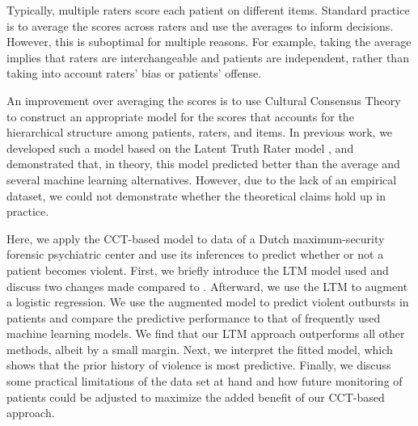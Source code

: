 \documentclass[a4paper,11pt]{article}
\begin{document}
Typically, multiple raters score each patient on different items.
Standard practice is to average the scores across raters and use the averages to inform decisions.
However, this is suboptimal for multiple reasons. %
For example, taking the average implies that raters are interchangeable and patients are independent, rather than taking into account raters' bias or patients' offense.


An improvement over averaging the scores is to use Cultural Consensus Theory \parencite[CCT;][]{romney1986culture, batchelder1988test, batchelder2012cultural} to construct an appropriate model for the scores that accounts for the hierarchical structure among patients, raters, and items.
In previous work, we developed such a model based on the Latent Truth Rater model \parencite[LTM; ][]{Anders2015cultural}, and demonstrated that, in theory, this model predicted better than the average and several machine learning alternatives.
However, due to the lack of an empirical dataset, we could not demonstrate whether the theoretical claims hold up in practice.


Here, we apply the CCT-based model to data of a Dutch maximum-security forensic psychiatric center and use its inferences to predict whether or not a patient becomes violent.
First, we briefly introduce the LTM model used and discuss two changes made compared to \textcite{vandenBergh2020cultural}.
Afterward, we use the LTM to augment a logistic regression.
We use the augmented model to predict violent outbursts in patients and compare the predictive performance to that of frequently used machine learning models.
We find that our LTM approach outperforms all other methods, albeit by a small margin.
Next, we interpret the fitted model, which shows that the prior history of violence is most predictive.
Finally, we discuss some practical limitations of the data set at hand and how future monitoring of patients could be adjusted to maximize the added benefit of our CCT-based approach.
\end{document}
